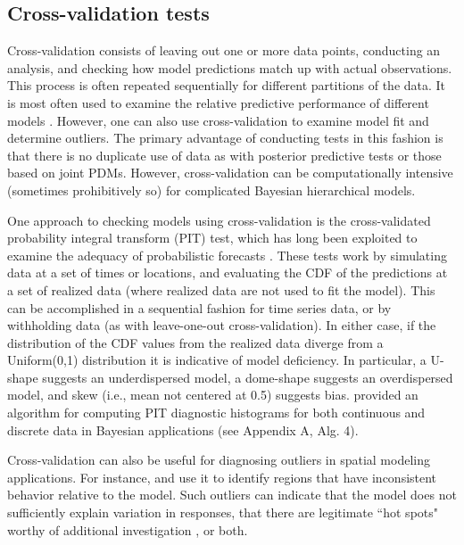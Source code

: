 \documentclass[12pt,english]{article}
\begin{document}
\begin{spacing}{1.9}
\subsection{Cross-validation tests}

Cross-validation consists of leaving out one or more data points,
conducting an analysis, and checking how model predictions match up
with actual observations.  This process is often repeated sequentially
for different partitions of the data.  It is most often used to
examine the relative predictive performance of different models
\citep[i.e., for model selection,][]{ArlotCelisse2010}.  However, one
can also use cross-validation to examine model fit and determine
outliers.  The primary advantage of conducting tests in this fashion
is that there is no duplicate use of data as with posterior predictive
tests or those based on joint PDMs. However, cross-validation can be
computationally intensive (sometimes prohibitively so) for complicated
Bayesian hierarchical models.

One approach to checking models using cross-validation is the
cross-validated probability integral transform (PIT) test, which has
long been exploited to examine the adequacy of probabilistic forecasts
\citep[e.g.,][]{Dawid1984,Fruiiwirth1996,GneitingEtAl2007,CzadoEtAl2009}. These
tests work by simulating data at a set of times or locations, and
evaluating the CDF of the predictions at a set of realized
data (where realized data are not used to fit the model).  This can be
accomplished in a sequential fashion for time series data, or by
withholding data (as with leave-one-out cross-validation).  In either
case, if the distribution of the CDF values from the realized data diverge from a Uniform(0,1) distribution 
it is indicative of
model deficiency.  In particular, a U-shape suggests an underdispersed
model, a dome-shape suggests an overdispersed model, and skew (i.e.,
mean not centered at 0.5) suggests bias.  \citet{Congdon2014} provided
an algorithm for computing PIT diagnostic histograms for both
continuous and discrete data in Bayesian applications (see Appendix A,
Alg. 4).

Cross-validation can also be useful for diagnosing outliers in spatial
modeling applications.  For instance, \citet{SternCressie2000} and
\citet{MarshallSpiegelhalter2003} use it to identify regions that have
inconsistent behavior relative to the model.  Such outliers can
indicate that the model does not sufficiently explain variation in
responses, that there are legitimate ``hot spots" worthy of additional
investigation \citep{MarshallSpiegelhalter2003}, or both.


\end{spacing}
\end{document}
